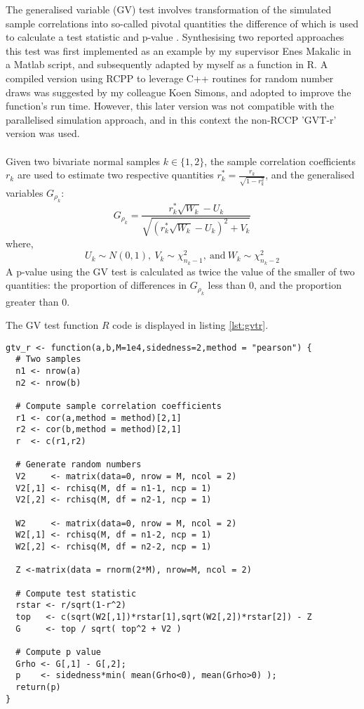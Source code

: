 The generalised variable (GV) test involves transformation of the simulated sample correlations into so-called pivotal quantities the difference of which is used to calculate a test statistic and p-value \cite{Krishnamoorthy2014}. Synthesising two reported approaches \cite{Krishnamoorthy2007,Kazemi2016} this test was first implemented as an example by my supervisor Enes Makalic in a Matlab script, and subsequently adapted by myself as a function in R.  A compiled version using RCPP to leverage C++ routines for random number draws was suggested by my colleague Koen Simons, and adopted to improve the function's run time. However, this later version was not compatible with the parallelised simulation approach, and in this context the non-RCCP 'GVT-r' version was used.
\\
\\
Given two bivariate normal samples $k\in\{1,2\}$, the sample correlation coefficients $r_k$ are used to estimate two respective quantities $r_k^* = \frac{r_k}{\sqrt{1-r_k^2}}$, and the generalised variables $G_{\rho_k}$:
$$G_{\rho_k} = \frac{r_k^*\sqrt{W_k} - U_k}{\sqrt{(r_k^*\sqrt{W_k} - U_k)^2 + V_k}}$$
where,
$$U_k \sim N(0,1) ,\ V_k \sim \chi_{n_k - 1}^2 ,\ \text{and} \ W_k \sim \chi_{n_k-2}^2$$
A p-value using the GV test is calculated as twice the value of the smaller of two quantities: the proportion of differences in $G_{\rho_k}$ less than 0, and the proportion greater than 0.

The GV test function $R$ code is displayed in listing \ref{lst:gvtr}.

\begin{lstlisting}[float=h,caption={GV test (R version)},label={lst:gvtr}]
gtv_r <- function(a,b,M=1e4,sidedness=2,method = "pearson") {
  # Two samples
  n1 <- nrow(a)
  n2 <- nrow(b)
  
  # Compute sample correlation coefficients
  r1 <- cor(a,method = method)[2,1]
  r2 <- cor(b,method = method)[2,1]
  r  <- c(r1,r2)
  
  # Generate random numbers
  V2     <- matrix(data=0, nrow = M, ncol = 2)
  V2[,1] <- rchisq(M, df = n1-1, ncp = 1)
  V2[,2] <- rchisq(M, df = n2-1, ncp = 1)
  
  W2     <- matrix(data=0, nrow = M, ncol = 2)
  W2[,1] <- rchisq(M, df = n1-2, ncp = 1)
  W2[,2] <- rchisq(M, df = n2-2, ncp = 1)
  
  Z <-matrix(data = rnorm(2*M), nrow=M, ncol = 2)
  
  # Compute test statistic
  rstar <- r/sqrt(1-r^2)
  top   <- c(sqrt(W2[,1])*rstar[1],sqrt(W2[,2])*rstar[2]) - Z
  G     <- top / sqrt( top^2 + V2 )
  
  # Compute p value
  Grho <- G[,1] - G[,2];
  p    <- sidedness*min( mean(Grho<0), mean(Grho>0) ); 
  return(p)
}
\end{lstlisting}

